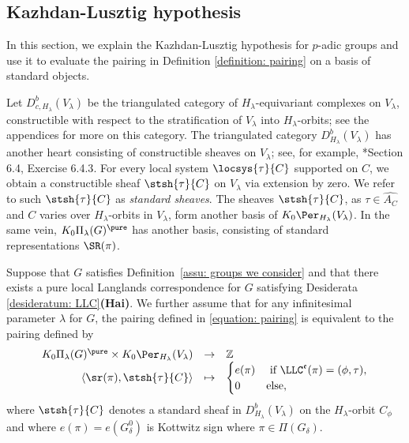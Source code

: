 \documentclass[11pt,letterpaper]{amsart}
\numberwithin{equation}{section}
\begin{document}
\subsection{Kazhdan-Lusztig hypothesis}\label{subsection: KLH}

In this section, we explain the Kazhdan-Lusztig hypothesis for $p$-adic groups and use it to evaluate the pairing in Definition \ref{definition: pairing} on a basis of standard objects. 

Let $D^b_{c,H_\lambda}(V_\lambda)$ be the triangulated category of $H_\lambda$-equivariant complexes on $V_\lambda$, constructible with respect to the stratification of $V_\lambda$ into $H_\lambda$-orbits; see the appendices for more on this category.
The triangulated category $D^b_{H_\lambda}(V_\lambda)$ 
 has another heart consisting of constructible sheaves on $V_\lambda$; see, for example,
\cite{Ach21}*{Section 6.4, Exercise 6.4.3}.
For every local system $\locsys{\tau}{C}$ supported on $C$, we obtain a constructible sheaf $\stsh{\tau}{C}$ on $V_\lambda$ via extension by zero.
We refer to such $\stsh{\tau}{C}$ as \textit{standard sheaves}. The sheaves $\stsh{\tau}{C}$, as $\tau \in \widehat{A_C}$ and $C$ varies over $H_\lambda$-orbits in $V_\lambda$, form another basis of $K_0\Per_{H_\lambda}(V_\lambda)$. In the same vein, $K_0\Pi_{\lambda}(G)^\pure$ has another basis, consisting of standard representations $\SR(\pi)$.








\begin{hypothesis}\label{hypothesis: KLH}
    Suppose that $G$ satisfies Definition~\ref{assu: groups we consider} and that there exists a pure local Langlands correspondence for $G$ satisfying Desiderata \ref{desideratum: LLC}\textbf{(Hai)}. We further assume that for any infinitesimal parameter $\lambda$ for $G$, 
  the pairing defined in \eqref{equation: pairing} is equivalent to the pairing defined by
\begin{equation*}\label{equation: KLH}
    \begin{array}{rcl}
        K_0\Pi_\lambda(G)^\pure \times K_0\Per_{H_\lambda}(V_\lambda)
            &\to& \mathbb{Z}\\
        \langle \sr(\pi), \stsh{\tau}{C}\rangle 
            &\mapsto& 
            \begin{cases}
                e(\pi) & \text{ if }\LLC^{\mathfrak{e}}(\pi) = (\phi,\tau), \\
                0 & \text{else},
            \end{cases}
    \end{array}
\end{equation*}
where $\stsh{\tau}{C}$ denotes a standard sheaf in $D^b_{H_\lambda}(V_\lambda)$ on the $H_\lambda$-orbit $C_\phi$ and where $e(\pi)=e(G_{\delta}^0)$ is Kottwitz sign where $\pi \in \Pi(G_{\delta})$. 
\end{hypothesis}
\end{document}
